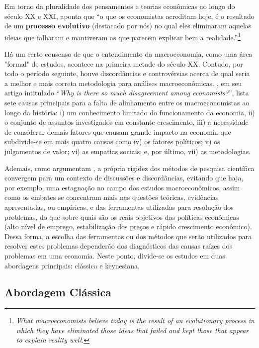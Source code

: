 Em torno da pluralidade dos pensamentos e teorias econômicas ao longo do século XX e XXI, \citeauthor*{blanchard_macroeconomics_2020} aponta que \enquote{o que os economistas acreditam hoje, é o resultado de um \textbf{processo evolutivo} (destacado por nós) no qual eles eliminaram aquelas ideias que falharam e mantiveram as que parecem explicar bem a realidade.}\footnote{\textit{What macroeconomists believe today is the result of an evolutionary process in which they have eliminated those ideas that failed and kept those that appear to explain reality well.}}

Há um certo consenso de que o entendimento da macroeconomia, como uma área "formal" de estudos, acontece na primeira metade do século XX. Contudo, por todo o período seguinte, houve discordâncias e controvérsias acerca de qual seria a melhor e mais correta metodologia para análises macroeconômicas. , em seu artigo intitulado \enquote{\textit{Why is there so much disagreement among economists?}}, lista sete causas principais para a falta de alinhamento entre os macroeconomistas ao longo da história: i) um conhecimento limitado do funcionamento da economia, ii) o conjunto de assuntos investigados em constante crescimento, iii) a necessidade de considerar demais fatores que causam grande impacto na economia que subdivide-se em mais quatro causas como iv) os fatores políticos; v) os julgamentos de valor; vi) as empatias sociais; e, por último, vii) as metodologias.

Ademais, como argumentam , a própria rigidez dos métodos de pesquisa científica convergem para um contexto de discussões e discordâncias, evitando que haja, por exemplo, uma estagnação no campo dos estudos macroeconômicos, assim como os embates se concentram mais nas questões teóricas, evidências apresentadas, ou empíricas, e das ferramentas utilizadas para resolução dos problemas, do que sobre quais são os reais objetivos das políticas econômicas (alto nível de emprego, estabilização dos preços e rápido crescimento econômico). Dessa forma, a escolha das ferramentas ou dos métodos que serão utilizados para resolver estes problemas dependerão dos diagnósticos das causas raízes dos problemas em uma economia. Neste ponto, divide-se os estudos em duas abordagens principais: clássica e keynesiana.

\subsection{Abordagem Clássica}

